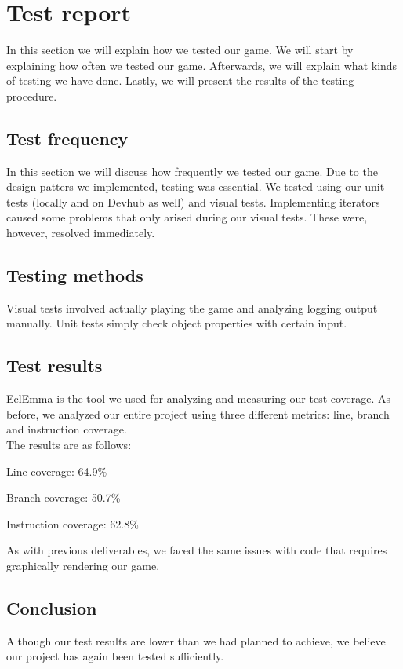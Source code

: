\documentclass[a4paper,11pt,report]{scrartcl}
\begin{document}
\newpage\section{Test report}

In this section we will explain how we tested our game. We will start by
explaining how often we tested our game. Afterwards, we will explain what
kinds of testing we have done. Lastly, we will present the results of the
testing procedure.

\subsection{Test frequency}
In this section we will discuss how frequently we tested our game. Due to the
design patters we implemented, testing was essential. We tested using our
unit tests (locally and on Devhub as well) and visual tests. Implementing
iterators caused some problems that only arised during our visual tests. These
were, however, resolved immediately.

\subsection{Testing methods}
Visual tests involved actually playing the game and analyzing logging output
manually. Unit tests simply check object properties with certain input.

\subsection{Test results}
EclEmma is the tool we used for analyzing and measuring our test coverage.
As before, we analyzed our entire project using three different metrics: line,
branch and instruction coverage.\\

The results are as follows:
\begin{description}
	\item Line coverage: 64.9\%
	\item Branch coverage: 50.7\%
	\item Instruction coverage: 62.8\%
\end{description}
As with previous deliverables, we faced the same issues with code that requires
graphically rendering our game. 

\subsection{Conclusion}
Although our test results are lower than we had planned to achieve, we believe
our project has again been tested sufficiently.
\end{document}
